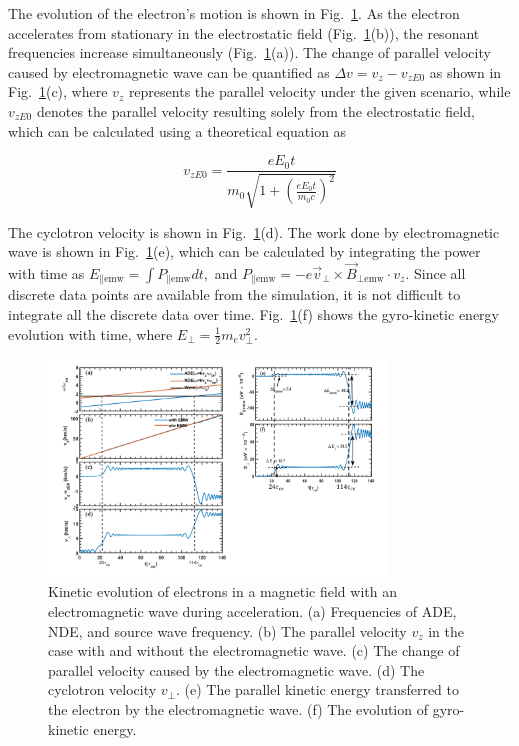 \documentclass{cpbtex3}
\begin{document}
\vspace{1em}

The evolution of the electron's motion is shown in Fig.~\ref{fig:kinetic_evolution}. As the electron accelerates from stationary in the electrostatic field (Fig.~\ref{fig:kinetic_evolution}(b)), the resonant frequencies increase simultaneously (Fig.~\ref{fig:kinetic_evolution}(a)). The change of parallel velocity caused by electromagnetic wave can be quantified as \( \Delta v = v_z - v_{zE0} \) as shown in Fig.~\ref{fig:kinetic_evolution}(c), where \( v_z \) represents the parallel velocity under the given scenario, while \( v_{zE0} \) denotes the parallel velocity resulting solely from the electrostatic field, which can be calculated using a theoretical equation as

\begin{equation}
v_{zE0} = \frac{e E_0 t}{m_0 \sqrt{1 + \left( \frac{e E_0 t}{m_0 c} \right)^2 }}
\end{equation}

\vspace{1em}

The cyclotron velocity is shown in Fig.~\ref{fig:kinetic_evolution}(d). The work done by electromagnetic wave is shown in Fig.~\ref{fig:kinetic_evolution}(e), which can be calculated by integrating the power with time as 
\(
E_{\parallel \text{emw}} = \int P_{\parallel \text{emw}} dt ,
\)
and 
\(
P_{\parallel \text{emw}} = -e \vec{v}_\perp \times \vec{B}_{\perp \text{emw}} \cdot v_z.
\)
Since all discrete data points are available from the simulation, it is not difficult to integrate all the discrete data over time. Fig.~\ref{fig:kinetic_evolution}(f) shows the gyro-kinetic energy evolution with time, where 
\(
E_\perp = \frac{1}{2} m_e v_\perp^2.
\)

\begin{figure}[ht]
\centering
\includegraphics[width=0.8\textwidth]{Figure5.pdf}%
\caption{\label{fig:NumSim}Kinetic evolution of electrons in a magnetic field with an electromagnetic wave during acceleration. 
    (a) Frequencies of ADE, NDE, and source wave frequency. 
    (b) The parallel velocity $v_z$ in the case with and without the electromagnetic wave. 
    (c) The change of parallel velocity caused by the electromagnetic wave. 
    (d) The cyclotron velocity $v_\perp$. 
    (e) The parallel kinetic energy transferred to the electron by the electromagnetic wave. 
    (f) The evolution of gyro-kinetic energy.}
    \label{fig:kinetic_evolution}
\end{figure}
\end{document}

